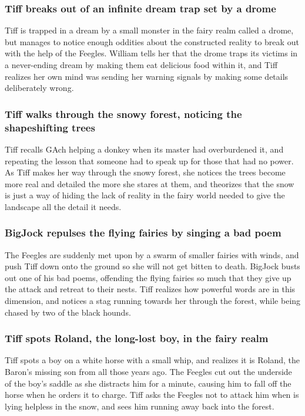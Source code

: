 \subsubsection{\Gls{Tiff} breaks out of an infinite dream trap set by a drome}
\Gls{Tiff} is trapped in a dream by a small monster in the fairy realm called a drome, but manages
to notice enough oddities about the constructed reality to break out with the help of the Feegles.
\Gls{William} tells her that the drome traps its victims in a never-ending dream by making them eat
delicious food within it, and \Gls{Tiff} realizes her own mind was sending her warning signals by
making some details deliberately wrong.

\subsubsection{\Gls{Tiff} walks through the snowy forest, noticing the shapeshifting trees}
\Gls{Tiff} recalls \Gls{GAch} helping a donkey when its master had overburdened it, and repeating
the lesson that someone had to speak up for those that had no power. As \Gls{Tiff} makes her way
through the snowy forest, she notices the trees become more real and detailed the more she stares
at them, and theorizes that the snow is just a way of hiding the lack of reality in the fairy world
needed to give the landscape all the detail it needs.

\subsubsection{\Gls{BigJock} repulses the flying fairies by singing a bad poem}
The Feegles are suddenly met upon by a swarm of smaller fairies with winds, and push \Gls{Tiff} down
onto the ground so she will not get bitten to death. \Gls{BigJock} busts out one of his bad poems,
offending the flying fairies so much that they give up the attack and retreat to their nests.
\Gls{Tiff} realizes how powerful words are in this dimension, and notices a stag running towards
her through the forest, while being chased by two of the black hounds.

\subsubsection{\Gls{Tiff} spots \Gls{Roland}, the long-lost boy, in the fairy realm}
\Gls{Tiff} spots a boy on a white horse with a small whip, and realizes it is \Gls{Roland}, the
\Gls{Baron}'s missing son from all those years ago. The Feegles cut out the underside of the boy's
saddle as she distracts him for a minute, causing him to fall off the horse when he orders it to
charge. \Gls{Tiff} asks the Feegles not to attack him when is lying helpless in the snow, and sees
him running away back into the forest.

